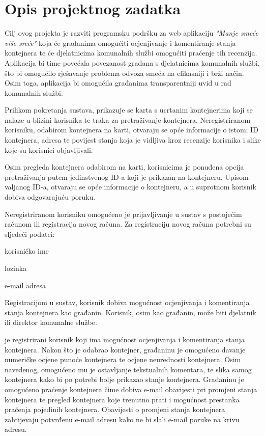 \chapter{Opis projektnog zadatka}
		
		Cilj ovog projekta je razviti programsku podršku za web aplikaciju \textit{"Manje smeće više sreće"} koja će građanima omogućiti ocjenjivanje i komentiranje stanja kontejnera te će djelatnicima komunalnih službi omogućiti praćenje tih recenzija.
		Aplikacija bi time povećala povezanost građana s djelatnicima komunalnih službi, što bi omogućilo rješavanje problema odvoza smeća na efikasniji i brži način. 
		Osim toga, aplikacija bi omogućila građanima transparentniji uvid u rad komunalnih službi.
		
		Prilikom pokretanja sustava, prikazuje se karta s ucrtanim kontejnerima koji se nalaze u blizini korisnika te traka za pretraživanje kontejnera.
		Neregistriranom korisniku, odabirom kontejnera na karti, otvaraju se opće informacije o istom; ID kontejnera, adresa te povijest stanja koja je vidljiva kroz recenzije korisnika i slike koje su korisnici objavljivali.
		
		Osim pregleda kontejnera odabirom na karti, korisnicima je ponuđena opcija pretraživanja putem jedinstvenog ID-a koji je prikazan na kontejneru.
		Upisom valjanog ID-a, otvaraju se opće informacije o kontejneru, a u suprotnom korisnik dobiva odgovarajuću poruku.
		
		Neregistriranom korisniku omogućeno je prijavljivanje u sustav s postojećim računom ili registracija novog računa.
		Za registraciju novog računa potrebni su sljedeći podatci:
		\begin{packed_item}
			
			\item  korisničko ime
			\item  lozinka
			\item  e-mail adresa
			
		\end{packed_item}
		
		Registracijom u sustav, korisnik dobiva mogućnost ocjenjivanja i komentiranja stanja kontejnera kao građanin. 
		Korisnik, osim kao građanin, može biti djelatnik ili direktor komunalne službe.
		
		 je registrirani korisnik koji ima mogućnost ocjenjivanja i komentiranja stanja kontejnera. 
		Nakon što je odabrao kontejner, građaninu je omogućeno davanje numeričke ocjene punoće kontejnera te ocjene neurednosti kontejnera.
		Osim navedenog, omogućeno mu je ostavljanje tekstualnih komentara, te slika samog kontejnera kako bi po potrebi bolje prikazao stanje kontejnera.
		Građaninu je omogućeno praćenje kontejnera čime dobiva e-mail obavijesti pri promjeni stanja kontejnera te pregled kontejnera koje trenutno prati i mogućnost prestanka praćenja pojedinih kontejnera. 
		Obavijesti o promjeni stanja kontejnera zahtijevaju potvrđenu e-mail adresu kako ne bi slali e-mail poruke na krivu adresu. 
		
